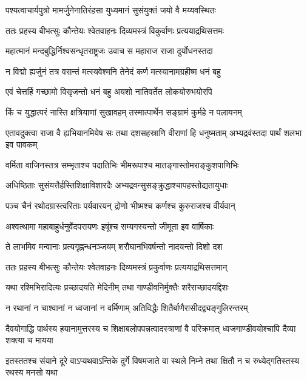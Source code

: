 \twolineshloka
{पश्यत्वाचार्यपुत्रो मामर्जुनेनातिरंहसा}
{युध्यमानं सुसंयुक्तं जयो वै मय्यवस्थितः}



\twolineshloka
{ततः प्रहस्य बीभत्सुः कौन्तेयः श्वेतवाहनः}
{दिव्यमस्त्रं विकुर्वाणः प्रत्ययाद्रथिसत्तमः}


\twolineshloka
{महात्मानं मन्दबुद्धिर्निश्वसन्धृतराष्ट्रजः}
{उवाच स महाराज राजा दुर्योधनस्तदा}


\twolineshloka
{न विद्मो ह्यर्जुनं तत्र वसन्तं मत्स्यवेश्मनि}
{तेनेदं कर्ण मत्स्यानामग्रहीष्म धनं बहु}


\twolineshloka
{एवं चेत्तर्हि गच्छामो विसृजन्तो धनं बहु}
{अयशो नातिवर्तेत लोकयोरुभयोरपि}


\twolineshloka
{किं च युद्धात्परं नास्ति क्षत्रियाणां सुखावहम्}
{तस्मात्पार्थेन सङ्ग्रामं कुर्महे न पलायनम्}


\threelineshloka
{एतावदुक्त्वा राजा वै ह्यभियानमियेष सः}
{तथा दशसहस्राणि वीराणां हि धनुष्मताम्}
{अभ्यद्रवंस्तदा पार्थं शलभा इव पावकम्}


\twolineshloka
{वर्मिता वाजिनस्तत्र सम्भृताश्च पदातिभिः}
{भीमरूपाश्च मातङ्गास्तोमराङ्कुशपाणिभिः}



\twolineshloka
{अधिष्ठिताः सुसंयत्तैर्हस्तिशिक्षाविशारदैः}
{अभ्यद्रवन्सुसङ्क्रुद्धाश्चापहस्तोद्यतायुधाः}


\twolineshloka
{पञ्च चैनं रथोदग्रास्त्वरिताः पर्यवारयन्}
{द्रोणो भीष्मश्च कर्णश्च कुरुराजश्च वीर्यवान्}


\twolineshloka
{अश्वत्थामा महाबाहुर्धनुर्वेदपरायणः}
{इषूंश्च सम्यगस्यन्तो जीमूता इव वार्षिकाः}


\twolineshloka
{ते लाभमिव मन्वानाः प्रत्यगृह्णन्धनञ्जयम्}
{शरौघानभिवर्षन्तो नादयन्तो दिशो दश}


\twolineshloka
{ततः प्रहस्य बीभत्सुः कौन्तेयः श्वेतवाहनः}
{दिव्यमस्त्रं प्रकुर्वाणः प्रत्ययाद्रथिसत्तमान्}


\twolineshloka
{यथा रश्मिभिरादित्यः प्रच्छादयति मेदिनीम्}
{तथा गाण्डीवनिर्मुक्तैः शरैराच्छादयद्दिशः}


\twolineshloka
{न रथानां न चाश्वानां न ध्वजानां न वर्मिणाम्}
{अतिविद्धैः शितैर्बाणैरासीदद्व्यङ्गुलिरन्तरम्}


\threelineshloka
{दैवयोगाद्धि पार्थस्य हयानामुत्तरस्य च}
{शिक्षाबलोपपन्नत्वादस्त्राणां वै परिक्रमात्}
{ध्वजगाण्डीवयोश्चापि दैव्या शक्त्या च मायया}


\threelineshloka
{इतस्ततश्च संयाने दूरे वाऽप्यथवाऽन्तिके}
{दुर्गे विषमजाते वा स्थले निम्ने तथा क्षितौ}
{न च रुध्येद्गतिस्तस्य रथस्य मनसो यथा}


